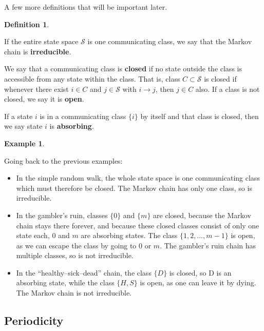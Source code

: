 \documentclass[
  a4paper,
]{article}
\providecommand{\tightlist}{%
  \setlength{\itemsep}{0pt}\setlength{\parskip}{0pt}}
\theoremstyle{definition}
\newtheorem{definition}{Definition}[section]
\theoremstyle{definition}
\newtheorem{example}{Example}[section]
\theoremstyle{definition}
\theoremstyle{remark}
\begin{document}
A few more definitions that will be important later.

\begin{definition}
\protect\hypertarget{def:irreducible}{}\label{def:irreducible}

If the entire state space \(\mathcal S\) is one communicating class, we say that the Markov chain is \textbf{irreducible}.

We say that a communicating class is \textbf{closed} if no state outside the class is accessible from any state within the class. That is, class \(C \subset \mathcal S\) is closed if whenever there exist \(i \in C\) and \(j \in \mathcal S\) with \(i \to j\), then \(j \in C\) also. If a class is not closed, we say it is \textbf{open}.

If a state \(i\) is in a communicating class \(\{i\}\) by itself and that class is closed, then we say state \(i\) is \textbf{absorbing}.

\end{definition}

\begin{example}
\protect\hypertarget{exm:ex-irred}{}\label{exm:ex-irred}

Going back to the previous examples:

\begin{itemize}
\tightlist
\item
  In the simple random walk, the whole state space is one communicating class which must therefore be closed. The Markov chain has only one class, so is irreducible.
\item
  In the gambler's ruin, classes \(\{0\}\) and \(\{m\}\) are closed, because the Markov chain stays there forever, and because these closed classes consist of only one state each, \(0\) and \(m\) are absorbing states. The class \(\{1, 2, \dots, m-1\}\) is open, as we can escape the class by going to \(0\) or \(m\). The gambler's ruin chain has multiple classes, so is not irreducible.
\item
  In the ``healthy--sick--dead'' chain, the class \(\{D\}\) is closed, so D is an absorbing state, while the class \(\{H, S\}\) is open, as one can leave it by dying. The Markov chain is not irreducible.
\end{itemize}

\end{example}

\hypertarget{periodicity}{%
\subsection{Periodicity}\label{periodicity}}
\end{document}
